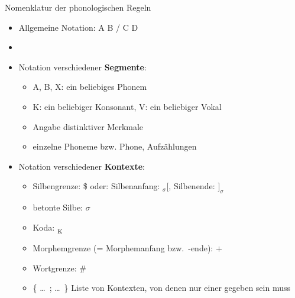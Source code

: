 \begin{frame}{Nomenklatur der phonologischen Regeln}

\settowidth{}

\begin{itemize}
	\item Allgemeine Notation: A \ras B / C \underline{\quad} D
	\item[]  
\end{itemize}


\begin{minipage}{.8\textwidth}
\begin{itemize}
	\item Notation verschiedener \textbf{Segmente}:
	\begin{itemize}
		\item A, B, X: ein beliebiges Phonem
		\item K: ein beliebiger Konsonant, V: ein beliebiger Vokal
		\item Angabe distinktiver Merkmale
		\item einzelne Phoneme bzw. Phone, Aufzählungen
	\end{itemize}
\end{itemize}
\end{minipage}
\begin{minipage}[c][][c]{.19\textwidth}


\end{minipage}

\begin{itemize}
	\item Notation verschiedener \textbf{Kontexte}:
	\begin{itemize}
		\item Silbengrenze: \$ oder: Silbenanfang: $_\sigma[$, Silbenende: $]_\sigma$
		\item betonte Silbe: \textprimstress$\sigma$
		\item Koda: \underline{\quad}$_{\textsubscript{K}}$
		\item Morphemgrenze (= Morphemanfang bzw.\ -ende): $+$
		\item Wortgrenze: \#
		\item \{ \dots\ ; \dots\ \} Liste von Kontexten, von denen nur einer gegeben sein muss
	\end{itemize}

\end{itemize}

\end{frame}



